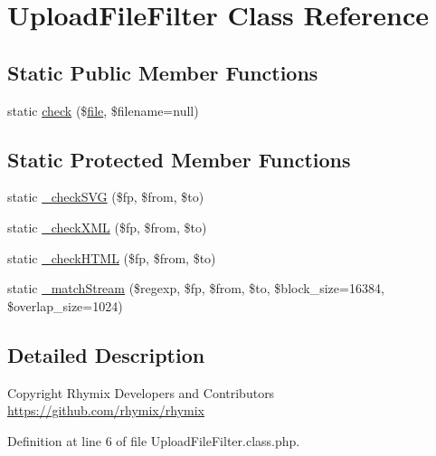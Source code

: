 \hypertarget{classUploadFileFilter}{\section{Upload\-File\-Filter Class Reference}
\label{classUploadFileFilter}
}
\subsection*{Static Public Member Functions}
\begin{DoxyCompactItemize}
\item 
static \hyperlink{classUploadFileFilter_a9565ee257232d4a75ff25d927c8325c7}{check} (\$\hyperlink{classfile}{file}, \$filename=null)
\end{DoxyCompactItemize}
\subsection*{Static Protected Member Functions}
\begin{DoxyCompactItemize}
\item 
static \hyperlink{classUploadFileFilter_a80165dd0683a32deb3b715c5af327b4d}{\-\_\-check\-S\-V\-G} (\$fp, \$from, \$to)
\item 
static \hyperlink{classUploadFileFilter_acfd029bb340f0a780af6a8b75889263d}{\-\_\-check\-X\-M\-L} (\$fp, \$from, \$to)
\item 
static \hyperlink{classUploadFileFilter_afcc4840a0d1546211908bdc4972540e1}{\-\_\-check\-H\-T\-M\-L} (\$fp, \$from, \$to)
\item 
static \hyperlink{classUploadFileFilter_a578ea4dfe06b1ad6b31ff9b423bc5b15}{\-\_\-match\-Stream} (\$regexp, \$fp, \$from, \$to, \$block\-\_\-size=16384, \$overlap\-\_\-size=1024)
\end{DoxyCompactItemize}


\subsection{Detailed Description}
\begin{DoxyCopyright}{Copyright}
Rhymix Developers and Contributors \hyperlink{}{https\-://github.\-com/rhymix/rhymix}
\end{DoxyCopyright}


Definition at line 6 of file Upload\-File\-Filter.\-class.\-php.



